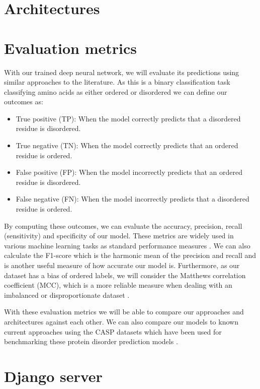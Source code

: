 \documentclass{l4proj}
\begin{document}
\section{Architectures}

\section{Evaluation metrics}
\label{chap:analysis sec:evaluation}
With our trained deep neural network, we will evaluate its predictions using similar approaches to the literature. As this is a binary classification task classifying amino acids as either ordered or disordered we can define our outcomes as: 

\begin{itemize}    
    \item True positive (TP): When the model correctly predicts that a disordered residue is disordered.
    \item True negative (TN): When the model correctly predicts that an ordered residue is ordered.
    \item False positive (FP): When the model incorrectly predicts that an ordered residue is disordered.
    \item False negative (FN): When the model incorrectly predicts that a disordered residue is ordered. \citep{google_TP}
\end{itemize}

By computing these outcomes, we can evaluate the accuracy, precision, recall (sensitivity) and specificity of our model. These metrics are widely used in various machine learning tasks as standard performance measures \citep{BC:wiki}. We can also calculate the F1-score which is the harmonic mean of the precision and recall and is another useful measure of how accurate our model is. Furthermore, as our dataset has a bias of ordered labels, we will consider the Matthews correlation coefficient (MCC), which is a more reliable measure when dealing with an imbalanced or disproportionate dataset \citep{Chicco:20}.

With these evaluation metrics we will be able to compare our approaches and architectures against each other. We can also compare our models to known current approaches using the CASP datasets which have been used for benchmarking these protein disorder prediction models \citep{casp}.

\section{Django server}
\end{document}
